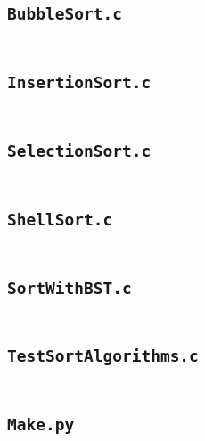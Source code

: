 \documentclass[12pt, fleqn]{report}                             %
\theoremstyle{break}                                            %
\begin{document}
\begin{appendices}
            \subsection{\texttt{BubbleSort.c}}
                \inputminted[breaklines, linenos, tabsize=4, fontsize=\footnotesize]{c}{code/BubbleSort.c}
                
            \subsection{\texttt{InsertionSort.c}}
                \inputminted[breaklines, linenos, tabsize=4, fontsize=\footnotesize]{c}{code/InsertionSort.c}
                
            \subsection{\texttt{SelectionSort.c}}
                \inputminted[breaklines, linenos, tabsize=4, fontsize=\footnotesize]{c}{code/SelectionSort.c}
                
            \subsection{\texttt{ShellSort.c}}
                \inputminted[breaklines, linenos, tabsize=4, fontsize=\footnotesize]{c}{code/ShellSort.c}
                
            \subsection{\texttt{SortWithBST.c}}
                \inputminted[breaklines, linenos, tabsize=4, fontsize=\footnotesize]{c}{code/SortWithBST.c}
                
            \subsection{\texttt{TestSortAlgorithms.c}}
                \inputminted[breaklines, linenos, tabsize=4, fontsize=\footnotesize]{c}{code/TestSortAlgorithms.c}
                
            \subsection{\texttt{Make.py}}
                \inputminted[breaklines, linenos, tabsize=4, fontsize=\footnotesize]{python}{code/Make.py}
	

\end{appendices}
\end{document}
